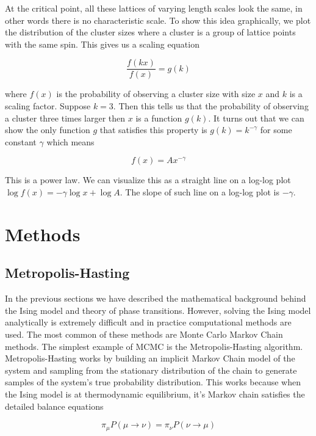\documentclass{article}
\begin{document}
At the critical point, all these lattices of varying length scales look the same, in other words there is no 
characteristic scale. To show this idea graphically, we plot the distribution of the cluster sizes where a cluster is a group of lattice points with
the same spin. This gives us a scaling equation 



\begin{equation}
    \frac{f(kx)}{f(x)} = g(k)
\end{equation}

where $f(x)$ is the probability of observing a cluster size with size $x$ and $k$ is a scaling factor.
Suppose $k=3$. Then this tells us that the probability of observing a cluster three times larger then $x$
is a function $g(k)$. It turns out that we can show the only function $g$ that satisfies this property is
$g(k) = k^{-\gamma}$ for some constant $\gamma$ which means


\begin{equation}
    f(x) = A x^{-\gamma}
\end{equation}

This is a power law. We can visualize this as a straight line on a log-log plot $\log f(x) = -\gamma \log x + \log A$.
The slope of such line on a log-log plot is $-\gamma$.
 
\section{Methods}
\label{Methods}

\subsection{Metropolis-Hasting}
In the previous sections we have described the mathematical background behind the Ising model and theory of phase transitions.
However, solving the Ising model analytically is extremely difficult and in practice computational methods are used. The most common of these methods 
are Monte Carlo Markov Chain methods. The simplest  example of MCMC is the Metropolis-Hasting algorithm. Metropolis-Hasting works by building 
an implicit Markov Chain model of the system and sampling from the stationary distribution of the chain to generate samples of the system's true probability
distribution. This works because when the Ising model is at thermodynamic equilibrium, it's Markov chain satisfies the detailed balance equations

\begin{equation}
    \pi_{\mu} P(\mu \rightarrow \nu) = \pi_{\nu} P(\nu \rightarrow \mu)
\end{equation}
\end{document}

